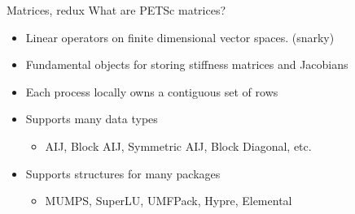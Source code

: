 \begin{frame}{Matrices, redux}
What are PETSc matrices?
\begin{itemize}
\item Linear operators on finite dimensional vector spaces. (snarky)
  \item<2> Fundamental objects for storing stiffness matrices and Jacobians
  \item<2> Each process locally owns a contiguous set of rows
  \item<2> Supports many data types
  \begin{itemize}
    \item AIJ, Block AIJ, Symmetric AIJ, Block Diagonal, etc.
  \end{itemize}
  \item<2> Supports structures for many packages
  \begin{itemize}
    \item MUMPS, SuperLU, UMFPack, Hypre, Elemental
  \end{itemize}
\end{itemize}
\end{frame}
